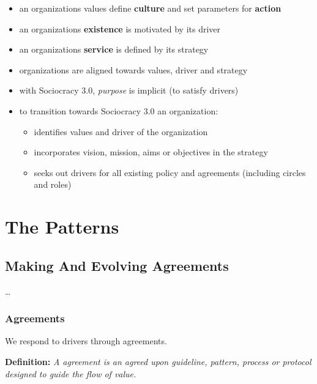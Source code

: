 \begin{itemize}
\item an organizations values define \textbf{culture} and set parameters for \textbf{action}

\item an organizations \textbf{existence} is motivated by its driver

\item an organizations \textbf{service} is defined by its strategy

\item organizations are aligned towards values, driver and strategy

\item with Sociocracy 3.0, \emph{purpose} is implicit (to satisfy drivers)

\item to transition towards Sociocracy 3.0 an organization:

\begin{itemize}
\item identifies values and driver of the organization

\item incorporates vision, mission, aims or objectives in the strategy

\item seeks out drivers for all existing policy and agreements (including circles and roles)

\end{itemize}

\end{itemize}

\part{The Patterns}
\label{thepatterns}

\chapter{Making And Evolving Agreements}
\label{makingandevolvingagreements}

{\ldots}

\section{Agreements}
\label{agreements}

We respond to drivers through agreements.

\textbf{Definition:} \emph{A agreement is an agreed upon guideline, pattern, process or protocol designed to guide the flow of value.}

